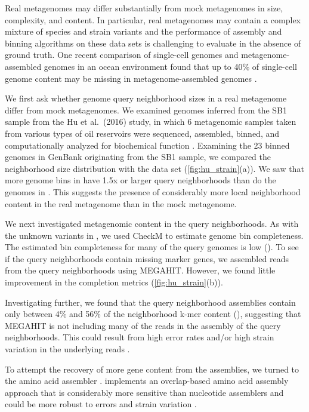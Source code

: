 Real metagenomes may differ substantially from mock metagenomes in
size, complexity, and content.  In particular, real metagenomes may
contain a complex mixture of species and strain variants \cite{Sharon2015}
and the performance of assembly and binning algorithms on these data sets
is challenging to evaluate in the absence of ground truth.
One recent comparison of single-cell genomes and metagenome-assembled
genomes in an ocean environment found that up to 40\% of single-cell
genome content may be missing in metagenome-assembled genomes \cite{baltic}.

We first ask whether genome query neighborhood sizes in a real
metagenome differ from mock metagenomes.  We examined genomes inferred
from the SB1 sample from the Hu et al.\ (2016) study, in which 6
metagenomic samples taken from various types of oil reservoirs were
sequenced, assembled, binned, and computationally analyzed for
biochemical function \cite{Hu2016}.  Examining the 23 binned genomes
in GenBank originating from the SB1 sample, we compared the \hu
neighborhood size distribution with the \podarv data set
(\autoref{fig:hu_strain}(a)). We saw that more genome bins in \hu
have 1.5x or larger query neighborhoods than do the genomes in
\podarv. This suggests the presence of considerably more local
neighborhood content in the real metagenome than in the mock
metagenome.

We next investigated metagenomic content in the query
neighborhoods.  As with the unknown variants in \podarv, we used
CheckM to estimate genome bin completeness.  The estimated bin
completeness for many of the query genomes is low
().
To see if the query neighborhoods contain missing marker genes, we
assembled reads from the query neighborhoods using MEGAHIT.  However,
we found little improvement in the completion metrics (\autoref{fig:hu_strain}(b)).

Investigating further, we found that the query neighborhood assemblies
contain only between 4\% and 56\% of the neighborhood k-mer
content (), suggesting that MEGAHIT is
not including many of the reads in the assembly of the query neighborhoods.
This could result from high
error rates and/or high strain variation in the underlying reads
\cite{CAMI,Awad155358}.

To attempt the recovery of more gene content from the assemblies, we turned to
the \plass amino acid assembler \cite{plass}. \plass implements an
overlap-based amino acid assembly approach that is considerably more
sensitive than nucleotide assemblers and could be more robust to
errors and strain variation \cite{spa}.

